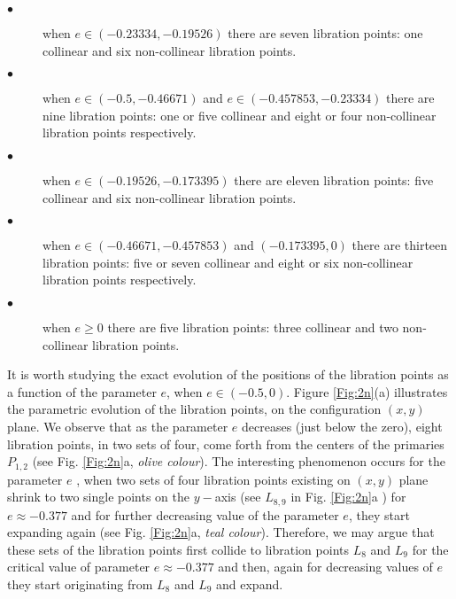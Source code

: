 \documentclass[preprint,fleqn,5p,numbers,sort&compress]{elsarticle}
\begin{document}
\begin{description}
 \item[$\bullet$] when $e\in (-0.23334, -0.19526)$ there are seven libration points: one collinear and six non-collinear libration points.
  \item[$\bullet$] when $e\in (-0.5, -0.46671)$  and $e\in (-0.457853, -0.23334)$ there are nine libration points: one or five collinear and eight or four non-collinear libration points respectively.
  \item[$\bullet$] when $e\in (-0.19526, -0.173395)$ there are eleven libration points: five collinear and six non-collinear libration points.
  \item[$\bullet$] when $e\in (-0.46671, -0.457853)$ and $(-0.173395, 0)$ there are thirteen libration points: five or seven collinear and eight or six non-collinear libration points respectively.
  \item[$\bullet$] when $e\geq0$ there are five libration points: three collinear and two non-collinear libration points.
\end{description}
It is worth studying the exact evolution of the positions of the libration points as a function of the parameter $e$, when $e\in (-0.5, 0)$. Figure \ref{Fig:2n}(a) illustrates the parametric evolution of the libration points, on the configuration $(x, y)$ plane.
We observe that as the parameter $e$ decreases (just below the zero), eight libration points, in two sets of four, come forth from the centers of the primaries $P_{1,2}$ (see Fig. \ref{Fig:2n}a, \emph{olive colour}). The interesting phenomenon occurs for the parameter $e$ , when two sets of four libration points existing on $(x, y)$ plane shrink to two single points on the $y-$axis (see $L_{8,9}$ in Fig. \ref{Fig:2n}a ) for $e\approx-0.377$ and for further decreasing value of the parameter $e$, they start expanding again (see Fig. \ref{Fig:2n}a, \emph{teal colour}). Therefore, we may argue that these sets of the libration points first collide to libration points $L_8$ and $L_9$ for the critical value of parameter $e\approx-0.377$ and then, again for decreasing values of $e$ they start originating from $L_8$ and $L_9$ and expand.
\end{document}
